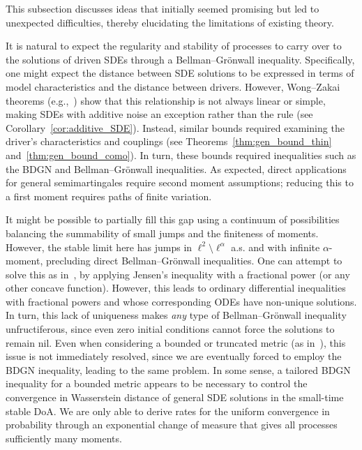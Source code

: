 \documentclass[en,oneside,bbfont,article]{amsart}
\theoremstyle{remark}
\theoremstyle{definition}
\theoremstyle{definition}
\newcommand\1{\mathds{1}}
\begin{document}
This subsection discusses ideas that initially seemed promising but led to unexpected difficulties, thereby elucidating the limitations of existing theory.

It is natural to expect the regularity and stability of processes to carry over to the solutions of driven SDEs through a Bellman--Gr\"onwall inequality. Specifically, one might expect the distance between SDE solutions to be expressed in terms of model characteristics and the distance between drivers. However, Wong--Zakai theorems (e.g.,~\cite{kosenkova2020orderconvergenceweakwongzakai,pavlyukevich2025stronguniformwongzakaiapproximations}) show that this relationship is not always linear or simple, making SDEs with additive noise an exception rather than the rule (see Corollary~\ref{cor:additive_SDE}). Instead, similar bounds required examining the driver's characteristics and couplings (see Theorems~\ref{thm:gen_bound_thin} and~\ref{thm:gen_bound_como}). In turn, these bounds required inequalities such as the BDGN and Bellman--Gr\"onwall inequalities. As expected, direct applications for general semimartingales require second moment assumptions; reducing this to a first moment requires paths of finite variation.

It might be possible to partially fill this gap using a continuum of possibilities balancing the summability of small jumps and the finiteness of moments. However, the stable limit here has jumps in $\ell^2\setminus\ell^{\alpha}$ a.s. and with infinite $\alpha$-moment, precluding direct Bellman--Gr\"onwall inequalities. One can attempt to solve this as in~\cite{WassersteinPaper}, by applying Jensen's inequality with a fractional power (or any other concave function). However, this leads to ordinary differential inequalities with fractional powers and whose corresponding ODEs have non-unique solutions. In turn, this lack of uniqueness makes \emph{any} type of Bellman--Gr\"onwall inequality unfructiferous, since even zero initial conditions cannot force the solutions to remain nil. Even when considering a bounded or truncated metric (as in~\cite{MR3332269}), this issue is not immediately resolved, since we are eventually forced to employ the BDGN inequality, leading to the same problem. In some sense, a tailored BDGN inequality for a bounded metric appears to be necessary to control the convergence in Wasserstein distance of general SDE solutions in the small-time stable DoA. We are only able to derive rates for the uniform convergence in probability through an exponential change of measure that gives all processes sufficiently many moments. 
\end{document}
